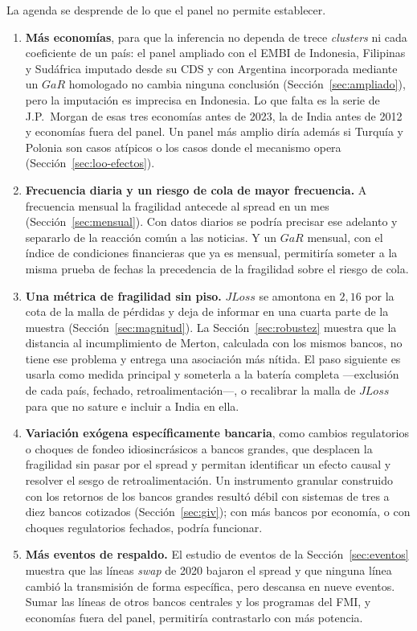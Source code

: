 La agenda se desprende de lo que el panel no permite establecer.

\begin{enumerate}
\item \textbf{Más economías}, para que la inferencia no dependa de trece \textit{clusters} ni cada coeficiente de un país: el panel ampliado con el EMBI de Indonesia, Filipinas y Sudáfrica imputado desde su CDS y con Argentina incorporada mediante un $GaR$ homologado no cambia ninguna conclusión (Sección~\ref{sec:ampliado}), pero la imputación es imprecisa en Indonesia. Lo que falta es la serie de J.P.\ Morgan de esas tres economías antes de 2023, la de India antes de 2012 y economías fuera del panel. Un panel más amplio diría además si Turquía y Polonia son casos atípicos o los casos donde el mecanismo opera (Sección~\ref{sec:loo-efectos}).
\item \textbf{Frecuencia diaria y un riesgo de cola de mayor frecuencia.} A frecuencia mensual la fragilidad antecede al spread en un mes (Sección~\ref{sec:mensual}). Con datos diarios se podría precisar ese adelanto y separarlo de la reacción común a las noticias. Y un $GaR$ mensual, con el índice de condiciones financieras que ya es mensual, permitiría someter a la misma prueba de fechas la precedencia de la fragilidad sobre el riesgo de cola.
\item \textbf{Una métrica de fragilidad sin piso.} $JLoss$ se amontona en $2{,}16$ por la cota de la malla de pérdidas y deja de informar en una cuarta parte de la muestra (Sección~\ref{sec:magnitud}). La Sección~\ref{sec:robustez} muestra que la distancia al incumplimiento de Merton, calculada con los mismos bancos, no tiene ese problema y entrega una asociación más nítida. El paso siguiente es usarla como medida principal y someterla a la batería completa ---exclusión de cada país, fechado, retroalimentación---, o recalibrar la malla de $JLoss$ para que no sature e incluir a India en ella.
\item \textbf{Variación exógena específicamente bancaria}, como cambios regulatorios o choques de fondeo idiosincrásicos a bancos grandes, que desplacen la fragilidad sin pasar por el spread y permitan identificar un efecto causal y resolver el sesgo de retroalimentación. Un instrumento granular construido con los retornos de los bancos grandes resultó débil con sistemas de tres a diez bancos cotizados (Sección~\ref{sec:giv}); con más bancos por economía, o con choques regulatorios fechados, podría funcionar.
\item \textbf{Más eventos de respaldo.} El estudio de eventos de la Sección~\ref{sec:eventos} muestra que las líneas \textit{swap} de 2020 bajaron el spread y que ninguna línea cambió la transmisión de forma específica, pero descansa en nueve eventos. Sumar las líneas de otros bancos centrales y los programas del FMI, y economías fuera del panel, permitiría contrastarlo con más potencia.

\end{enumerate}
